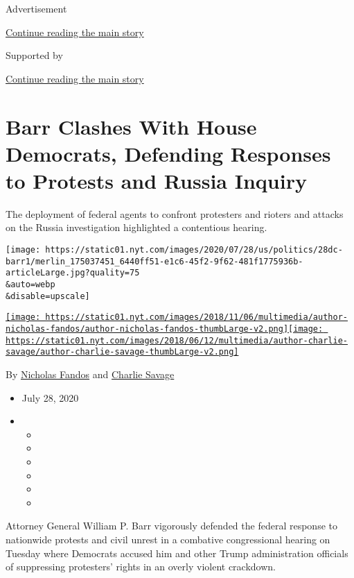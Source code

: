 Advertisement

\protect\hyperlink{after-top}{Continue reading the main story}

Supported by

\protect\hyperlink{after-sponsor}{Continue reading the main story}

\hypertarget{barr-clashes-with-house-democrats-defending-responses-to-protests-and-russia-inquiry}{%
\section{Barr Clashes With House Democrats, Defending Responses to
Protests and Russia
Inquiry}\label{barr-clashes-with-house-democrats-defending-responses-to-protests-and-russia-inquiry}}

The deployment of federal agents to confront protesters and rioters and
attacks on the Russia investigation highlighted a contentious hearing.

\texttt{[image: https://static01.nyt.com/images/2020/07/28/us/politics/28dc-barr1/merlin\_175037451\_6440ff51-e1c6-45f2-9f62-481f1775936b-articleLarge.jpg?quality=75\\\&auto=webp\\\&disable=upscale]}

\href{https://www.nytimes.com/by/nicholas-fandos}{\texttt{[image: https://static01.nyt.com/images/2018/11/06/multimedia/author-nicholas-fandos/author-nicholas-fandos-thumbLarge-v2.png]}}\href{https://www.nytimes.com/by/charlie-savage}{\texttt{[image: https://static01.nyt.com/images/2018/06/12/multimedia/author-charlie-savage/author-charlie-savage-thumbLarge-v2.png]}}

By \href{https://www.nytimes.com/by/nicholas-fandos}{Nicholas Fandos}
and \href{https://www.nytimes.com/by/charlie-savage}{Charlie Savage}

\begin{itemize}
\item
  July 28, 2020
\item
  \begin{itemize}
  \item
  \item
  \item
  \item
  \item
  \item
  \end{itemize}
\end{itemize}

Attorney General William P. Barr vigorously defended the federal
response to nationwide protests and civil unrest in a combative
congressional hearing on Tuesday where Democrats accused him and other
Trump administration officials of suppressing protesters' rights in an
overly violent crackdown.

